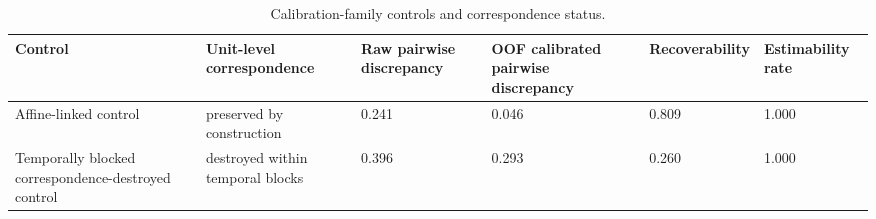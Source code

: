 \begin{table}[t]
\caption{Calibration-family controls and correspondence status.}
\label{tab:exp4_calibration_controls}
\begin{tabular}{llllll}
\toprule
Control & Unit-level correspondence & Raw pairwise discrepancy & OOF calibrated pairwise discrepancy & Recoverability & Estimability rate \\
\midrule
Affine-linked control & preserved by construction & 0.241 & 0.046 & 0.809 & 1.000 \\
Temporally blocked correspondence-destroyed control & destroyed within temporal blocks & 0.396 & 0.293 & 0.260 & 1.000 \\
\bottomrule
\end{tabular}
\end{table}
